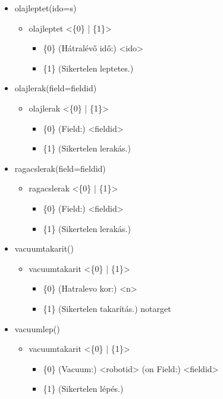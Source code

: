 \begin{itemize}
	\item olajleptet(ido=s)
	\begin{itemize}
		\item olajleptet  <\{0\} | \{1\}>
		\begin{itemize}
			\item \{0\} (Hátralévő idő:) <ido> 
			\item \{1\} (Sikertelen leptetes.)
		\end{itemize}
	\end{itemize}	
	
	\item olajlerak(field=fieldid)
	\begin{itemize}
		\item olajlerak  <\{0\} | \{1\}>
		\begin{itemize}
			\item \{0\} (Field:) <fieldid> 
			\item \{1\} (Sikertelen lerakás.)
		\end{itemize}
	\end{itemize}	
	
	\item ragacslerak(field=fieldid) 
	\begin{itemize}
		\item ragacslerak  <\{0\} | \{1\}>
		\begin{itemize}
			\item \{0\} (Field:) <fieldid> 
			\item \{1\} (Sikertelen lerakás.)
		\end{itemize}
	\end{itemize}		
	
	\item vacuumtakarit()
	\begin{itemize}
		\item vacuumtakarit  <\{0\} | \{1\}>
		\begin{itemize}
			\item \{0\} (Hatralevo kor:) <n>
			\item \{1\} (Sikertelen takarítás.) notarget
		\end{itemize}
	\end{itemize}
	
	\item vacuumlep()
	\begin{itemize}
		\item vacuumtakarit  <\{0\} | \{1\}>
		\begin{itemize}
			\item \{0\} (Vacuum:) <robotid> (on Field:) <fieldid> 
			\item \{1\} (Sikertelen lépés.)
		\end{itemize}
	\end{itemize}	
	

\end{itemize}
